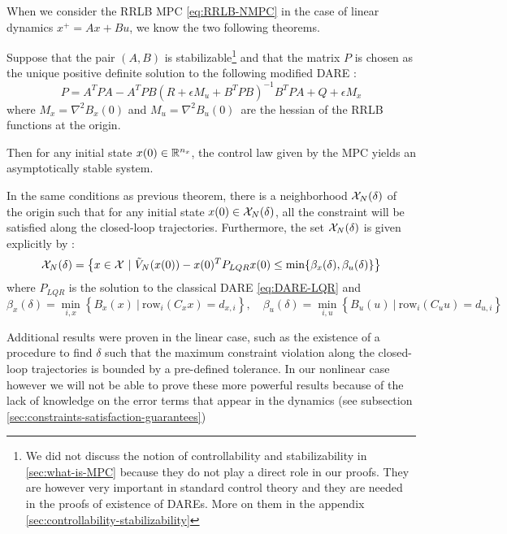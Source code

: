 \documentclass[12pt]{article}
\begin{document}
\vspace{12pt}

When we consider the RRLB MPC \ref{eq:RRLB-NMPC} in the case of linear dynamics $x^+=Ax+Bu$, we know the two following theorems.

\begin{theorem}
	\label{nominal-stability-linear-case}
	Suppose that the pair $(A,B)$ is stabilizable\footnote{We did not discuss the notion of controllability and stabilizability in \ref{sec:what-is-MPC} because they do not play a direct role in our proofs. They are however very important in standard control theory and they are needed in the proofs of existence of DAREs. More on them in the appendix \ref{sec:controllability-stabilizability}}
	and that the matrix $P$ is chosen as the unique positive definite solution to the following modified DARE :
	$$P=A^TPA-A^TPB(R+\epsilon M_u+B^TPB)^{-1}B^TPA+Q+\epsilon M_x$$
	where $M_x=\nabla^2 B_x(0)$ and $M_u=\nabla^2 B_u(0)$\, are the hessian of the RRLB functions at the origin.

	Then for any initial state $x(0)\in\R^{n_x}$, the control law given by the MPC yields an asymptotically stable system.
\end{theorem}

\begin{theorem}
	\label{constraint-satisfaction-guarantee-linear-case}
	In the same conditions as previous theorem, there is a neighborhood $\cal{X}_N(\delta)$ of the origin such that for any initial state $x(0)\in\cal{X}_N(\delta)$, all the constraint will be satisfied along the closed-loop trajectories.
	Furthermore, the set $\cal{X}_N(\delta)$ is given explicitly by :
	$$\cal{X}_N(\delta)=\left\{x\in\cal{X}~|~\tilde{V}_N(x(0))-x(0)^TP_{LQR}x(0)\leq\min\{\beta_x(\delta),\beta_u(\delta)\}\right\}$$
	where $P_{LQR}$ is the solution to the classical DARE \ref{eq:DARE-LQR} and 
	$$\beta_x(\delta)=\underset{i,x}{\min}\left\{ B_x(x)~|~\mathrm{row}_i(C_xx)=d_{x,i} \right\},\quad \beta_u(\delta)=\underset{i,u}{\min}\left\{ B_u(u)~|~\mathrm{row}_i(C_uu)=d_{u,i} \right\}$$
\end{theorem}

Additional results were proven in the linear case, such as the existence of a procedure to find $\delta$ such that the maximum constraint violation along the closed-loop trajectories is bounded by a pre-defined tolerance.
In our nonlinear case however we will not be able to prove these more powerful results because of the lack of knowledge on the error terms that appear in the dynamics (see subsection \ref{sec:constraints-satisfaction-guarantees})
\end{document}
